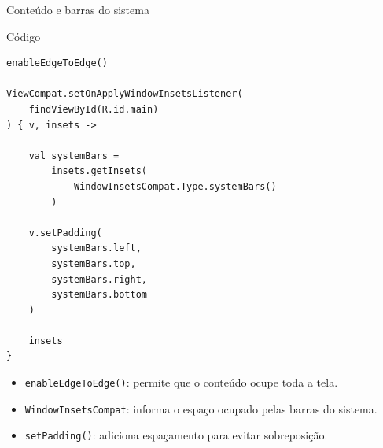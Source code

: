\documentclass[aspectratio=169]{beamer}
\begin{document}
\begin{frame}[fragile]{Conteúdo e barras do sistema}

\begin{block}{Código}
  \scriptsize
\begin{verbatim}
enableEdgeToEdge()

ViewCompat.setOnApplyWindowInsetsListener(
    findViewById(R.id.main)
) { v, insets ->

    val systemBars =
        insets.getInsets(
            WindowInsetsCompat.Type.systemBars()
        )

    v.setPadding(
        systemBars.left,
        systemBars.top,
        systemBars.right,
        systemBars.bottom
    )

    insets
}
\end{verbatim}
\end{block}


\vspace{0.3cm}

\begin{itemize}
    \item \texttt{enableEdgeToEdge()}: permite que o conteúdo ocupe toda a tela.
    \item \texttt{WindowInsetsCompat}: informa o espaço ocupado pelas barras do sistema.
    \item \texttt{setPadding()}: adiciona espaçamento para evitar sobreposição.
\end{itemize}

\end{frame}
\end{document}
